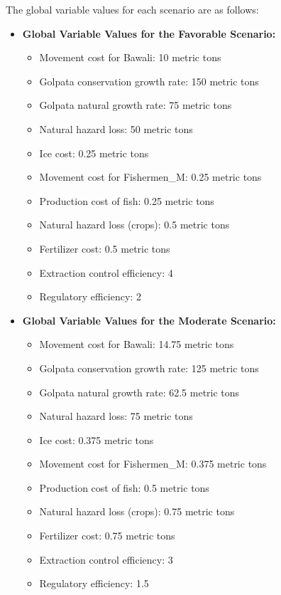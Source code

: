 \documentclass[final,5p,times,twocolumn,authoryear]{elsarticle}
\begin{document}
The global variable values for each scenario are as follows:

\begin{itemize}
    \item \textbf{Global Variable Values for the Favorable Scenario:}
    \begin{itemize}
        \item Movement cost for Bawali: 10 metric tons
        \item Golpata conservation growth rate: 150 metric tons
        \item Golpata natural growth rate: 75 metric tons
        \item Natural hazard loss: 50 metric tons
        \item Ice cost: 0.25 metric tons
        \item Movement cost for Fishermen\_M: 0.25 metric tons
        \item Production cost of fish: 0.25 metric tons
        \item Natural hazard loss (crops): 0.5 metric tons
        \item Fertilizer cost: 0.5 metric tons
        \item Extraction control efficiency: 4
        \item Regulatory efficiency: 2
    \end{itemize}

    \item \textbf{Global Variable Values for the Moderate Scenario:}
    \begin{itemize}
        \item Movement cost for Bawali: 14.75 metric tons
        \item Golpata conservation growth rate: 125 metric tons
        \item Golpata natural growth rate: 62.5 metric tons
        \item Natural hazard loss: 75 metric tons
        \item Ice cost: 0.375 metric tons
        \item Movement cost for Fishermen\_M: 0.375 metric tons
        \item Production cost of fish: 0.5 metric tons
        \item Natural hazard loss (crops): 0.75 metric tons
        \item Fertilizer cost: 0.75 metric tons
        \item Extraction control efficiency: 3
        \item Regulatory efficiency: 1.5
    \end{itemize}


\end{itemize}
\end{document}
